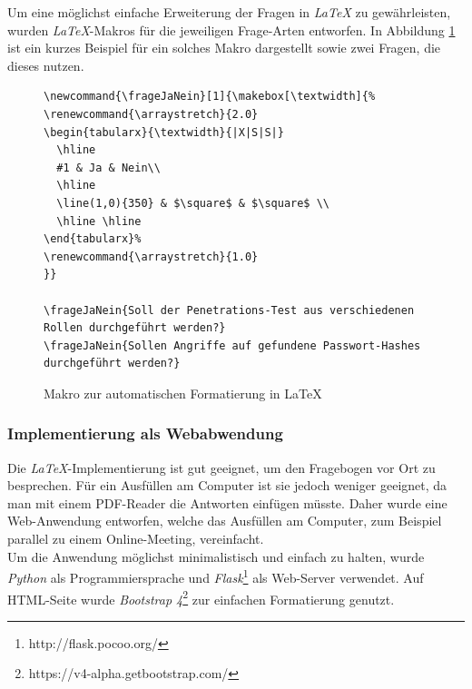 Um eine möglichst einfache Erweiterung der Fragen in \textit{LaTeX} zu gewährleisten, wurden \textit{LaTeX}-Makros für die jeweiligen Frage-Arten entworfen. In Abbildung \ref{lst:PenProzVorbAutFormat} ist ein kurzes Beispiel für ein solches Makro dargestellt sowie zwei Fragen, die dieses nutzen.

\begin{figure}
\lstset{language=Tex}
\begin{lstlisting}
\newcommand{\frageJaNein}[1]{\makebox[\textwidth]{%
\renewcommand{\arraystretch}{2.0}
\begin{tabularx}{\textwidth}{|X|S|S|}
  \hline
  #1 & Ja & Nein\\
  \hline
  \line(1,0){350} & $\square$ & $\square$ \\
  \hline \hline
\end{tabularx}%
\renewcommand{\arraystretch}{1.0}
}}

\frageJaNein{Soll der Penetrations-Test aus verschiedenen Rollen durchgeführt werden?}
\frageJaNein{Sollen Angriffe auf gefundene Passwort-Hashes durchgeführt werden?}
\end{lstlisting}
\caption{Makro zur automatischen Formatierung in LaTeX}
\label{lst:PenProzVorbAutFormat}
\end{figure}

\subsubsection{Implementierung als Webabwendung}\label{ref:AufImplInWeb}
Die \textit{LaTeX}-Implementierung ist gut geeignet, um den Fragebogen vor Ort zu besprechen. Für ein Ausfüllen am Computer ist sie jedoch weniger geeignet, da man mit einem  PDF-Reader die Antworten einfügen müsste. Daher wurde eine Web-Anwendung entworfen, welche das Ausfüllen am Computer, zum Beispiel parallel zu einem Online-Meeting, vereinfacht.\\

Um die Anwendung möglichst minimalistisch und einfach zu halten, wurde \textit{Python} als Programmiersprache und \textit{Flask}\footnote{http://flask.pocoo.org/} als Web-Server verwendet. Auf HTML-Seite wurde \textit{Bootstrap 4}\footnote{https://v4-alpha.getbootstrap.com/} zur einfachen Formatierung genutzt.\\

